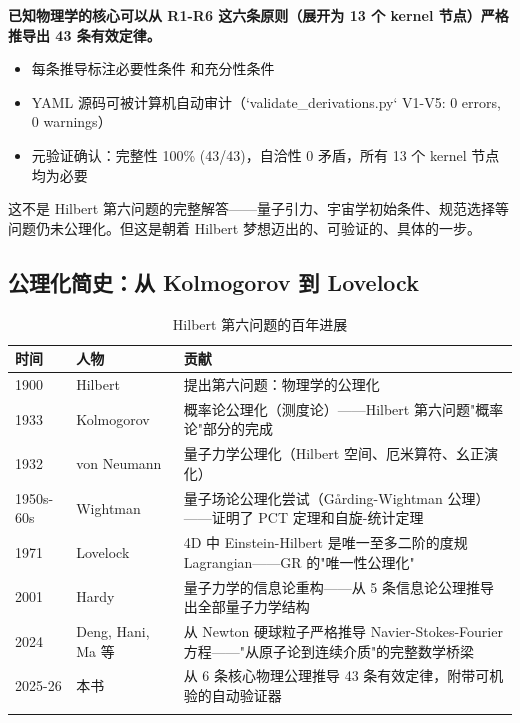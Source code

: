 \begin{insightbox}
  \textbf{已知物理学的核心可以从 R1-R6 这六条原则（展开为 13 个 kernel 节点）严格推导出 43 条有效定律。}

  \begin{itemize}
    \item 每条推导标注必要性条件 \fbox{[N]} 和充分性条件 \fbox{[S]}
    \item YAML 源码可被计算机自动审计（`validate\_derivations.py` V1-V5: 0 errors, 0 warnings）
    \item 元验证确认：完整性 100\% (43/43)，自洽性 0 矛盾，所有 13 个 kernel 节点均为必要
  \end{itemize}

  这不是 Hilbert 第六问题的完整解答——量子引力、宇宙学初始条件、规范选择等问题仍未公理化。但这是朝着 Hilbert 梦想迈出的、可验证的、具体的一步。
\end{insightbox}

\subsection{公理化简史：从 Kolmogorov 到 Lovelock}

\begin{center}
\footnotesize
\begin{longtable}{p{1.8cm}p{2.5cm}p{9.5cm}}
\toprule
\textbf{时间} & \textbf{人物} & \textbf{贡献} \\
\midrule
1900 & Hilbert & 提出第六问题：物理学的公理化 \\
1933 & Kolmogorov & 概率论公理化（测度论）——Hilbert 第六问题"概率论"部分的完成 \\
1932 & von Neumann & 量子力学公理化（Hilbert 空间、厄米算符、幺正演化） \\
1950s-60s & Wightman & 量子场论公理化尝试（Gårding-Wightman 公理）——证明了 PCT 定理和自旋-统计定理 \\
1971 & Lovelock & 4D 中 Einstein-Hilbert 是唯一至多二阶的度规 Lagrangian——GR 的"唯一性公理化" \\
2001 & Hardy & 量子力学的信息论重构——从 5 条信息论公理推导出全部量子力学结构 \\
2024 & Deng, Hani, Ma 等 & 从 Newton 硬球粒子严格推导 Navier-Stokes-Fourier 方程——"从原子论到连续介质"的完整数学桥梁 \\
2025-26 & 本书 & 从 6 条核心物理公理推导 43 条有效定律，附带可机验的自动验证器 \\
\bottomrule
\caption{Hilbert 第六问题的百年进展}
\end{longtable}
\end{center}

